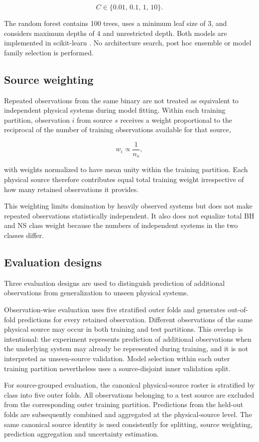 \documentclass[final,5p,authoryear,nopreprintline]{elsarticle}
\begin{document}
\[
C \in \{0.01,\,0.1,\,1,\,10\}.
\]

The random forest contains 100 trees, uses a minimum leaf size of 3, and considers maximum depths of 4 and unrestricted depth. Both models are implemented in scikit-learn \citep{Pedregosa2011}. No architecture search, post hoc ensemble or model family selection is performed.

\subsection{Source weighting}

Repeated observations from the same binary are not treated as equivalent to independent physical systems during model fitting. Within each training partition, observation $i$ from source $s$ receives a weight proportional to the reciprocal of the number of training observations available for that source,

\[
w_i \propto \frac{1}{n_s},
\]

with weights normalized to have mean unity within the training partition. Each physical source therefore contributes equal total training weight irrespective of how many retained observations it provides.

This weighting limits domination by heavily observed systems but does not make repeated observations statistically independent. It also does not equalize total BH and NS class weight because the numbers of independent systems in the two classes differ.

\subsection{Evaluation designs}

Three evaluation designs are used to distinguish prediction of additional observations from generalization to unseen physical systems.

Observation-wise evaluation uses five stratified outer folds and generates out-of-fold predictions for every retained observation. Different observations of the same physical source may occur in both training and test partitions. This overlap is intentional: the experiment represents prediction of additional observations when the underlying system may already be represented during training, and it is not interpreted as unseen-source validation. Model selection within each outer training partition nevertheless uses a source-disjoint inner validation split.

For source-grouped evaluation, the canonical physical-source roster is stratified by class into five outer folds. All observations belonging to a test source are excluded from the corresponding outer training partition. Predictions from the held-out folds are subsequently combined and aggregated at the physical-source level. The same canonical source identity is used consistently for splitting, source weighting, prediction aggregation and uncertainty estimation.
\end{document}
